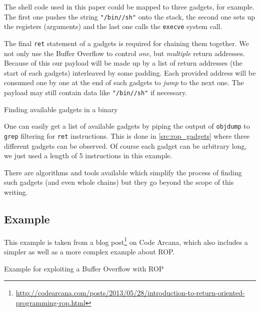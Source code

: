 \documentclass[article]{uibk}
\begin{document}
The shell code used in this paper could be mapped to three gadgets, for
example. The first one pushes the string \texttt{"/bin//sh"} onto the stack,
the second one sets up the registers (arguments) and the last one calls the
\texttt{execve} system call.

The final \texttt{ret} statement of a gadgets is required for chaining them
together. We not only use the Buffer Overflow to control \emph{one}, but
\emph{multiple} return addresses. Because of this our payload will be made up
by a list of return addresses (the start of each gadgets) interleaved by some
padding. Each provided address will be consumed one by one at the end of each
gadgets to \emph{jump} to the next one. The payload may still contain data like
\texttt{"/bin//sh"} if necessary.

\begin{listing}[h!]
    \caption{Finding available gadgets in a binary}
    \label{src:rop_gadgets}
\end{listing}

One can easily get a list of available gadgets by piping the output of
\texttt{objdump} to \texttt{grep} filtering for \texttt{ret} instructions. This
is done in \cref{src:rop_gadgets} where three different gadgets can be
observed. Of course each gadget can be arbitrary long, we just used a length of
5 instructions in this example.

There are algorithms and tools available which simplify the process of finding
such gadgets (and even whole chains) but they go beyond the scope of this
writing.~\cite{shacham2007}

\subsection{Example}

This example is taken from a blog
post\footnote{\url{http://codearcana.com/posts/2013/05/28/introduction-to-return-oriented-programming-rop.html}}
on Code Arcana, which also includes a simpler as well as a more complex example
about ROP.

\begin{listing}[h!]
    \begin{minipage}[t]{0.4\textwidth}
    \end{minipage}\hfill
    \begin{minipage}[t]{0.6\textwidth}
    \end{minipage}
    \caption{Example for exploiting a Buffer Overflow with ROP}
    \label{src:rop_example}
\end{listing}
\end{document}
